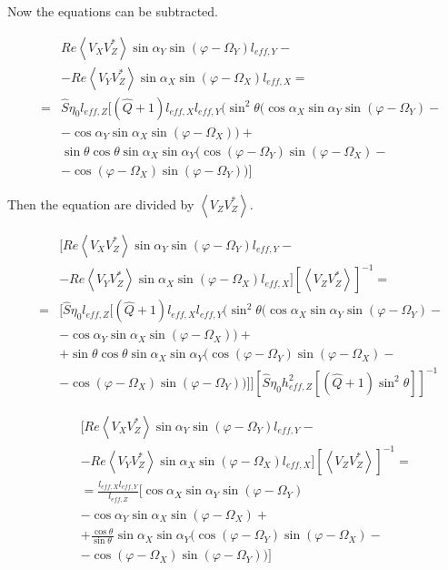 \documentclass[a4paper,11pt]{report}
\begin{document}
Now the equations can be subtracted.

\begin{eqnarray}
&&Re \left\langle V_X V_Z^{*}\right\rangle \sin \alpha_Y  \sin (\varphi - \Omega_Y) l_{eff,Y}
-\nonumber \\
&&- Re \left\langle V_Y V_Z^{*}\right\rangle\sin \alpha_X  \sin (\varphi - \Omega_X) l_{eff,X}= \nonumber\\
&=& \hat{S}\eta_0  l_{eff,Z}[(\hat{Q}+1) l_{eff,X} l_{eff,Y} (  \sin^2 \theta ( \cos \alpha_X  \sin \alpha_Y  \sin (\varphi - \Omega_Y)-\nonumber \\
&& -\cos \alpha_Y \sin \alpha_X  \sin (\varphi - \Omega_X))+\nonumber \\
&& \sin \theta \cos \theta \sin \alpha_X  \sin \alpha_Y ( \cos (\varphi - \Omega_Y)  \sin (\varphi - \Omega_X)-\nonumber \\
&& -\cos (\varphi - \Omega_X)  \sin (\varphi - \Omega_Y)) ]
\end{eqnarray}

Then the equation are divided by $\left\langle V_Z V_Z^{*} \right\rangle$.

\begin{eqnarray}
&&[Re \left\langle V_X V_Z^{*}\right\rangle \sin \alpha_Y  \sin (\varphi - \Omega_Y) l_{eff,Y}-\nonumber \\
&&-Re \left\langle V_Y V_Z^{*}\right\rangle\sin \alpha_X  \sin (\varphi - \Omega_X) l_{eff,X}] \left[ \left\langle V_Z V_Z^{*} \right\rangle \right]^{-1} =\nonumber \\
&=&[\hat{S}\eta_0  l_{eff,Z}[(\hat{Q}+1) l_{eff,X} l_{eff,Y} (  \sin^2 \theta ( \cos \alpha_X  \sin \alpha_Y  \sin (\varphi - \Omega_Y)-\nonumber \\
&& - \cos \alpha_Y \sin \alpha_X  \sin (\varphi - \Omega_X)) +\nonumber \\
&&+ \sin \theta \cos \theta \sin \alpha_X  \sin \alpha_Y ( \cos (\varphi - \Omega_Y)  \sin (\varphi - \Omega_X)-\nonumber \\
&&- \cos (\varphi - \Omega_X)  \sin (\varphi - \Omega_Y)) ]][\hat{S}\eta_0 h_{eff,Z}^2[(\hat{Q}+1) \sin^2 \theta ]]^{-1}
\end{eqnarray}

\begin{eqnarray}
&&[Re \left\langle V_X V_Z^{*}\right\rangle \sin \alpha_Y  \sin (\varphi - \Omega_Y) l_{eff,Y}-\nonumber \\
&&-Re \left\langle V_Y V_Z^{*}\right\rangle\sin \alpha_X  \sin (\varphi - \Omega_X) l_{eff,X}] \left[ \left\langle V_Z V_Z^{*} \right\rangle \right] ^{-1}= \nonumber \\
&&= \frac{  l_{eff,X} l_{eff,Y}}{ l_{eff,Z}} [\cos \alpha_X  \sin \alpha_Y  \sin (\varphi - \Omega_Y)  \nonumber\\
&&- \cos \alpha_Y \sin \alpha_X  \sin (\varphi - \Omega_X) +\nonumber \\
&&+  \frac{\cos \theta}{\sin \theta\ } \sin \alpha_X  \sin \alpha_Y ( \cos (\varphi - \Omega_Y)  \sin (\varphi - \Omega_X)-\nonumber \\
&&- \cos (\varphi - \Omega_X)  \sin (\varphi - \Omega_Y)) ]
\end{eqnarray}
\end{document}
